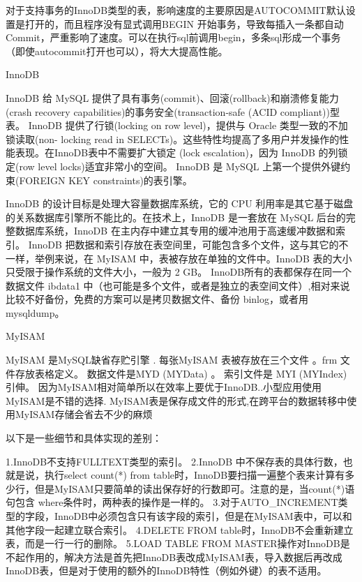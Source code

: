 \documentclass[UTF8]{ctexart}
\begin{document}
对于支持事务的InnoDB类型的表，影响速度的主要原因是AUTOCOMMIT默认设置是打开的，而且程序没有显式调用BEGIN 开始事务，导致每插入一条都自动Commit，严重影响了速度。可以在执行sql前调用begin，多条sql形成一个事务（即使autocommit打开也可以），将大大提高性能。  

InnoDB

InnoDB 给 MySQL 提供了具有事务(commit)、回滚(rollback)和崩溃修复能力 (crash recovery capabilities)的事务安全(transaction-safe (ACID compliant))型表。 InnoDB 提供了行锁(locking on row level)，提供与 Oracle 类型一致的不加锁读取(non- locking read in SELECTs)。这些特性均提高了多用户并发操作的性能表现。在InnoDB表中不需要扩大锁定 (lock escalation)，因为 InnoDB 的列锁定(row level locks)适宜非常小的空间。 InnoDB 是 MySQL 上第一个提供外键约束(FOREIGN KEY constraints)的表引擎。  

InnoDB 的设计目标是处理大容量数据库系统，它的 CPU 利用率是其它基于磁盘的关系数据库引擎所不能比的。在技术上，InnoDB 是一套放在 MySQL 后台的完整数据库系统，InnoDB 在主内存中建立其专用的缓冲池用于高速缓冲数据和索引。 InnoDB 把数据和索引存放在表空间里，可能包含多个文件，这与其它的不一样，举例来说，在 MyISAM 中，表被存放在单独的文件中。InnoDB 表的大小只受限于操作系统的文件大小，一般为 2 GB。  
InnoDB所有的表都保存在同一个数据文件 ibdata1 中（也可能是多个文件，或者是独立的表空间文件）,相对来说比较不好备份，免费的方案可以是拷贝数据文件、备份 binlog，或者用 mysqldump。  

MyISAM   

MyISAM 是MySQL缺省存贮引擎 .   
每张MyISAM 表被存放在三个文件 。frm 文件存放表格定义。 数据文件是MYD (MYData) 。 索引文件是 MYI (MYIndex) 引伸。   
因为MyISAM相对简单所以在效率上要优于InnoDB..小型应用使用MyISAM是不错的选择.   
MyISAM表是保存成文件的形式,在跨平台的数据转移中使用MyISAM存储会省去不少的麻烦   
  
以下是一些细节和具体实现的差别：   
  
1.InnoDB不支持FULLTEXT类型的索引。   
2.InnoDB 中不保存表的具体行数，也就是说，执行select count(*) from table时，InnoDB要扫描一遍整个表来计算有多少行，但是MyISAM只要简单的读出保存好的行数即可。注意的是，当count(*)语句包含 where条件时，两种表的操作是一样的。  
3.对于AUTO\_INCREMENT类型的字段，InnoDB中必须包含只有该字段的索引，但是在MyISAM表中，可以和其他字段一起建立联合索引。   
4.DELETE FROM table时，InnoDB不会重新建立表，而是一行一行的删除。   
5.LOAD TABLE FROM MASTER操作对InnoDB是不起作用的，解决方法是首先把InnoDB表改成MyISAM表，导入数据后再改成InnoDB表，但是对于使用的额外的InnoDB特性（例如外键）的表不适用。  
\end{document}
